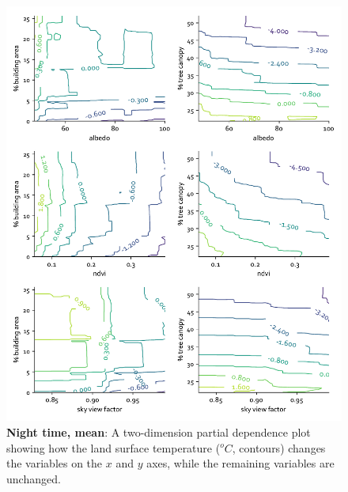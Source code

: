 \documentclass[final,3p,times,twocolumn,sort&compress]{elsarticle}
\begin{document}
\begin{figure}
    \centering
    \includegraphics[width=\linewidth]{fig/report/pdp_2d_night_500.pdf}
    \caption{
    \textbf{Night time, mean}: A two-dimension partial dependence plot showing how the land surface temperature ($^oC$, contours) changes the variables on the $x$ and $y$ axes, while the remaining variables are unchanged.
    }
    \label{fig:pdp_2dnight_500}
\end{figure}
\end{document}
